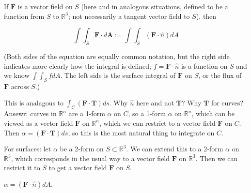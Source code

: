 \begin{definition}

If \(\boldsymbol{F}\) is a vector field on \(S\) (here and in analogous situations, defined to be a function from \(S\) to \(\mathbb{R}^3\); not necessarily a tangent vector field to \(S\)), then

\[
\int \int_S \boldsymbol{F} \cdot d\boldsymbol{A} := \int\int_S (\boldsymbol{F} \cdot \hat{n} ) dA
\]

(Both sides of the equation are equally common notation, but the right side indicates more clearly how the integral is defined; \(f = \boldsymbol{F} \cdot \hat{n}\) is a function on \(S\) and we know \(\int\int_S f dA\). The left side is the surface integral of \(\boldsymbol{F}\) on \(S\), or the flux of \(\boldsymbol{F}\) across \(S\).)

This is analagous to \(\int_C (\boldsymbol{F} \cdot \boldsymbol{T}) ds\). Why \(\hat{n}\) here and not \(\boldsymbol{T}\)? Why \(\boldsymbol{T}\) for curves? Ansewr: curves in \(\mathbb{R}^n\) are a 1-form \(\alpha\) on \(C\), so a 1-form \(\alpha\) on \(\mathbb{R}^n\), which can be viewed as a vector field \(\boldsymbol{F}\) on \(\mathbb{R}^n\), which we can restrict to a vector field \(\boldsymbol{F}\) on \(C\). Then \(\alpha = (\boldsymbol{F} \cdot \boldsymbol{T}) ds\), so this is the most natural thing to integrate on \(C\).

For surfaces: let \(\alpha\) be a 2-form on \(S \subset \mathbb{R}^3\). We can extend this to a 2-form \(\alpha\) on \(\mathbb{R}^3\), which corresponds in the usual way to a vector field \(\boldsymbol{F}\) on \(\mathbb{R}^3\). Then we can restrict it to \(S\) to get a vector field \(\boldsymbol{F}\) on \(S\).

\end{definition}

\begin{proposition}

\(\alpha = (\boldsymbol{F} \cdot \hat{n}) dA\).

\end{proposition}

